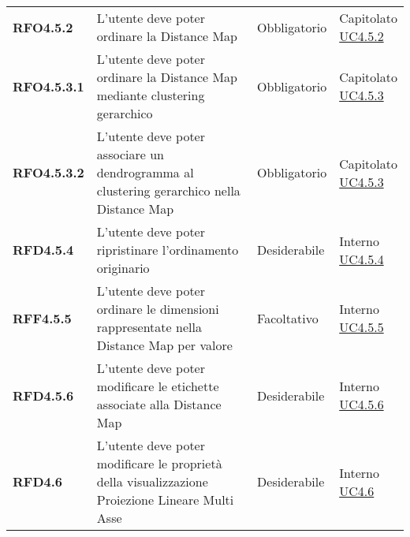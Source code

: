 \begin{longtable}[H]{| >{\raggedright\bfseries}m{20mm} | >{\raggedright}m{90mm} | >{\centering}m{25mm} | >{\centering\arraybackslash}m{30mm}|}
    RFO4.5.2
     & L'utente deve poter ordinare la Distance Map
     & Obbligatorio
     & \makecell{ Capitolato                                                                                             \\ \hyperref[par:uc4.5.2]{UC4.5.2} }\\

    RFO4.5.3.1
     & L'utente deve poter ordinare la Distance Map mediante clustering gerarchico
     & Obbligatorio
     & \makecell{ Capitolato                                                                                             \\ \hyperref[par:uc4.5.3]{UC4.5.3} }\\

    RFO4.5.3.2
     & L'utente deve poter associare un dendrogramma al clustering gerarchico nella Distance Map
     & Obbligatorio
     & \makecell{ Capitolato                                                                                             \\ \hyperref[par:uc4.5.3]{UC4.5.3} }\\

    RFD4.5.4
     & L'utente deve poter ripristinare l'ordinamento originario
     & Desiderabile
     & \makecell{ Interno                                                                                                \\ \hyperref[par:uc4.5.4]{UC4.5.4} }\\

    RFF4.5.5
     & L'utente deve poter ordinare le dimensioni rappresentate nella Distance Map per valore
     & Facoltativo
     & \makecell{ Interno                                                                                                \\ \hyperref[par:uc4.5.5]{UC4.5.5} }\\

    RFD4.5.6
     & L'utente deve poter modificare le etichette associate alla Distance Map
     & Desiderabile
     & \makecell{ Interno                                                                                                \\ \hyperref[par:uc4.5.6]{UC4.5.6} }\\

    RFD4.6
     & L'utente deve poter modificare le proprietà della visualizzazione Proiezione Lineare Multi Asse
     & Desiderabile
     & \makecell{ Interno                                                                                                \\  \hyperref[ssub:uc4.6]{UC4.6} }\\


\end{longtable}
